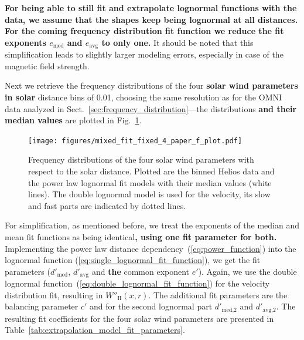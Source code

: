 \textbf{For being able to still fit and extrapolate lognormal functions with the data, we assume that the shapes keep being lognormal at all distances. For the coming frequency distribution fit function we reduce the fit exponents $e_\text{med}$ and $e_\text{avg}$ to only one.} It should be noted that this simplification leads to slightly larger modeling errors, especially in case of the magnetic field strength.

Next we retrieve the frequency distributions of the four \textbf{solar wind parameters in solar} distance bins of \SI{0.01}{\au}, choosing the same resolution as for the OMNI data analyzed in Sect.~\ref{sec:frequency_distribution}---the distributions \textbf{and their median values} are plotted in Fig.~\ref{fig:mixed_fit_fixed_4_paper_f_plot}.
\begin{figure}
	\texttt{[image: figures/mixed\_fit\_fixed\_4\_paper\_f\_plot.pdf]}
	\caption{Frequency distributions of the four solar wind parameters with respect to the solar distance. Plotted are the binned Helios data and the power law lognormal fit models with their median values (white lines). The double lognormal model is used for the velocity, its slow and fast parts are indicated by dotted lines.}
	\label{fig:mixed_fit_fixed_4_paper_f_plot}
\end{figure}
For simplification, as mentioned before, we treat the exponents of the median and mean fit functions as being identical\textbf{, using one fit parameter for both.} Implementing the power law distance dependency~(\ref{eq:power_function}) into the lognormal function (\ref{eq:single_lognormal_fit_function}), we get the fit parameters ($d'_\text{med}$, $d'_\text{avg}$ and \textbf{the} common exponent $e'$). Again, we use the double lognormal function~(\ref{eq:double_lognormal_fit_function}) for the velocity distribution fit, resulting in $W''_\text{II}(x,r)$. The additional fit parameters are the balancing parameter $c'$ and for the second lognormal part $d'_\text{med,2}$ and $d'_\text{avg,2}$. The resulting fit coefficients for the four solar wind parameters are presented in Table~\ref{tab:extrapolation_model_fit_parameters}.
